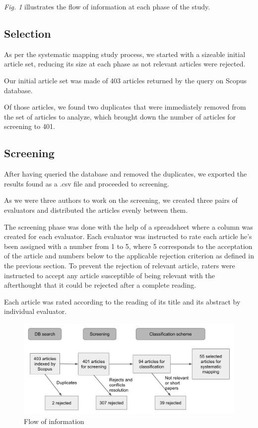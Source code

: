 \documentclass[letterpaper, 10 pt, conference]{ieeeconf}  %
\begin{document}
\textit{Fig. 1} illustrates the flow of information at each phase of the study.

\subsection{Selection}

As per the systematic mapping study process, we started with a sizeable initial
article set, reducing its size at each phase as not relevant articles were rejected.

Our initial article set was made of 403 articles returned by the query on Scopus
database.

Of those articles, we found two duplicates that were immediately removed from
the set of articles to analyze, which brought down the number of articles for
screening to 401.

\subsection{Screening}

After having queried the database and removed the duplicates, we exported the
results found as a .csv file and proceeded to screening.

As we were three authors to work on the screening, we created three pairs
of evaluators and distributed the articles evenly between them.

The screening phase was done with the help of a spreadsheet where a column was
created for each evaluator.
Each evaluator was instructed to rate each article he's been assigned with a number
from 1 to 5, where 5 corresponds to the acceptation of the article and numbers below
to the applicable rejection criterion as defined in the previous section.
To prevent the rejection of relevant article, raters were instructed to accept
any article susceptible of being relevant with the afterthought that it could be
rejected after a complete reading.

Each article was rated according to the reading of its title and its abstract by
individual evaluator.

\begin{figure}[tb]
 \centering
 \includegraphics[scale=0.5]{flow.png}
 \caption{Flow of information}
\end{figure}
\end{document}
